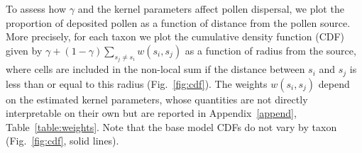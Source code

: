 \documentclass[12pt]{article}
\begin{document}

To assess how $\gamma$ and the kernel parameters affect pollen
dispersal, we plot the proportion of deposited pollen as a function
of distance from the pollen source. More precisely, for each taxon we
plot the cumulative density function (CDF) given by $\gamma + (1-
\gamma) \sum_{s_j \neq s_i} w(s_i, s_j)$ as a function of radius from
the source, where cells are included in the non-local sum if the
distance between $s_i$ and $s_j$ is less than or equal to this radius
(Fig.~\ref{fig:cdf}). The weights $w(s_i, s_j)$ depend on the
estimated kernel parameters, whose quantities are not directly
interpretable on their own but are reported in Appendix~\ref{append},
Table~\ref{table:weights}. Note that the base model CDFs do not vary
by taxon (Fig.~\ref{fig:cdf}, solid lines).
\end{document}
